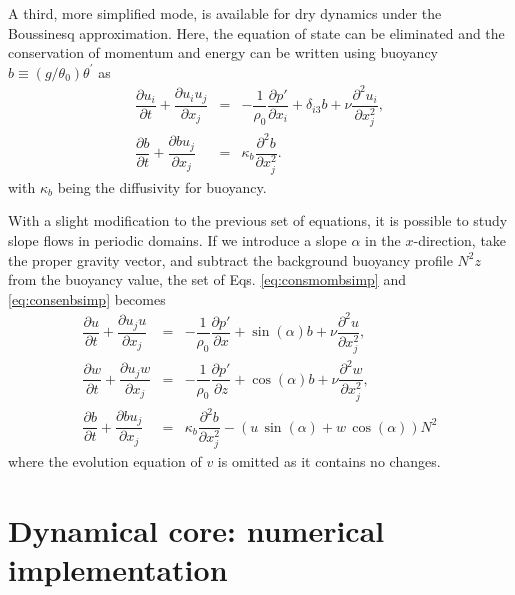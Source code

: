 \documentclass[gmd]{copernicus}
\begin{document}
A third, more simplified mode, is available for dry dynamics under the Boussinesq approximation. Here, the equation of state can be eliminated and the conservation of momentum and energy can be written using buoyancy $b \equiv (g/\theta_0)\theta^\prime$ as
\begin{eqnarray}
\dfrac{\partial u_i}{\partial t} + \dfrac{\partial u_i u_j}{\partial x_j} & = & 
- \dfrac{1}{\rho_0}\dfrac{\partial p'}{\partial x_i} + \delta_{i3} b + \nu \dfrac{\partial^2 u_i}{\partial x_j^2}\label{eq:consmombsimp},\\
\dfrac{\partial b}{\partial t} + \dfrac{\partial b u_j}{\partial x_j} & = & 
\kappa_b \dfrac{\partial^2 b}{\partial x_j^2}\label{eq:consenbsimp}.
\end{eqnarray}
with $\kappa_b$ being the diffusivity for buoyancy.

With a slight modification to the previous set of equations, it is possible to study slope flows in periodic domains. If we introduce a slope $\alpha$ in the $x$-direction, take the proper gravity vector, and subtract the background buoyancy profile $N^2 z$ from the buoyancy value, the set of Eqs. \ref{eq:consmombsimp} and \ref{eq:consenbsimp} becomes
\begin{eqnarray}
\dfrac{\partial u}{\partial t} + \dfrac{\partial u_j u}{\partial x_j} & = & 
- \dfrac{1}{\rho_0}\dfrac{\partial p'}{\partial x} + \sin(\alpha) b + \nu \dfrac{\partial^2 u}{\partial x_j^2}\label{eq:consuslope},\\
\dfrac{\partial w}{\partial t} + \dfrac{\partial u_j w}{\partial x_j} & = & 
- \dfrac{1}{\rho_0}\dfrac{\partial p'}{\partial z} + \cos(\alpha) b + \nu \dfrac{\partial^2 w}{\partial x_j^2}\label{eq:conswslope},\\
\dfrac{\partial b}{\partial t} + \dfrac{\partial b u_j}{\partial x_j} & = & 
\kappa_b \dfrac{\partial^2 b}{\partial x_j^2} - \left (u\,\sin(\alpha) + w\,\cos(\alpha) \right) N^2\label{eq:consbslope}
\end{eqnarray}
where the evolution equation of $v$ is omitted as it contains no changes.

\section{Dynamical core: numerical implementation}\label{sec:dyncorediscrete}
\end{document}
